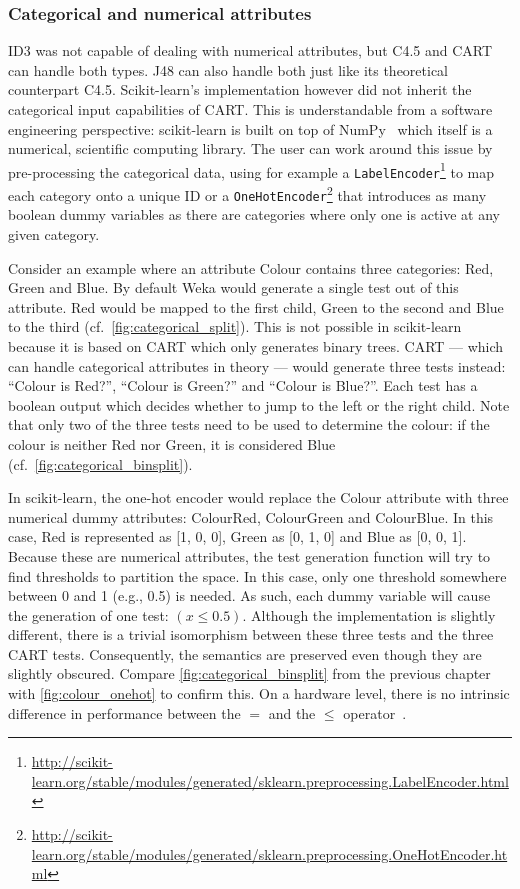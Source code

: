 \subsubsection{Categorical and numerical attributes}%
\label{sssec:cat_num_attr}
ID3 was not capable of dealing with numerical attributes, but C4.5 and CART can handle both types. J48 can also handle both just like its theoretical counterpart C4.5. Scikit-learn's implementation however did not inherit the categorical input capabilities of CART. This is understandable from a software engineering perspective: scikit-learn is built on top of NumPy~\cite{numpy} which itself is a numerical, scientific computing library. The user can work around this issue by pre-processing the categorical data, using for example a \texttt{LabelEncoder}\footnote{\url{http://scikit-learn.org/stable/modules/generated/sklearn.preprocessing.LabelEncoder.html}} to map each category onto a unique ID or a \texttt{OneHotEncoder}\footnote{\url{http://scikit-learn.org/stable/modules/generated/sklearn.preprocessing.OneHotEncoder.html}} that introduces as many boolean dummy variables as there are categories where only one is active at any given category.

Consider an example where an attribute Colour contains three categories: Red, Green and Blue. By default Weka would generate a single test out of this attribute. Red would be mapped to the first child, Green to the second and Blue to the third (cf.~\autoref{fig:categorical_split}). This is not possible in scikit-learn because it is based on CART which only generates binary trees. CART --- which can handle categorical attributes in theory --- would generate three tests instead: ``Colour is Red?'', ``Colour is Green?'' and ``Colour is Blue?''. Each test has a boolean output which decides whether to jump to the left or the right child. Note that only two of the three tests need to be used to determine the colour: if the colour is neither Red nor Green, it is considered Blue (cf.~\autoref{fig:categorical_binsplit}).

In scikit-learn, the one-hot encoder would replace the Colour attribute with three numerical dummy attributes: ColourRed, ColourGreen and ColourBlue. In this case, Red is represented as [1, 0, 0], Green as [0, 1, 0] and Blue as [0, 0, 1]. Because these are numerical attributes, the test generation function will try to find thresholds to partition the space. In this case, only one threshold somewhere between 0 and 1 (e.g., 0.5) is needed. As such, each dummy variable will cause the generation of one test: $(x \leqslant 0.5)$. Although the implementation is slightly different, there is a trivial isomorphism between these three tests and the three CART tests. Consequently, the semantics are preserved even though they are slightly obscured. Compare \autoref{fig:categorical_binsplit} from the previous chapter with \autoref{fig:colour_onehot} to confirm this. On a hardware level, there is no intrinsic difference in performance between the $=$ and the $\leqslant$ operator~\cite{microarchitecture}.


